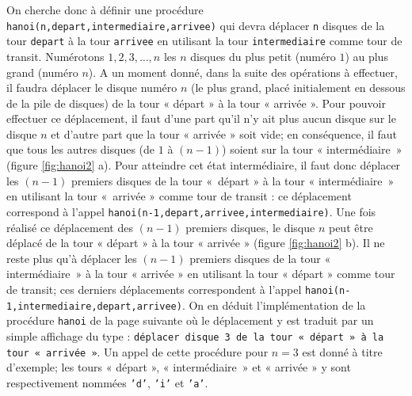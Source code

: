 \noindent On cherche donc à définir une procédure 
{\tt hanoi(n,depart,intermediaire,arrivee)} qui devra déplacer
{\tt n} disques de la tour {\tt depart} à la tour {\tt arrivee}
en utilisant la tour {\tt intermediaire} comme tour de 
transit.
Numérotons $1,2,3,\ldots,n$ les $n$ disques du plus
petit (numéro $1$) au plus grand (numéro $n$). A un moment donné,
dans la suite des opérations à effectuer, il faudra déplacer le disque 
numéro $n$ (le plus grand, placé initialement en dessous de la 
pile de disques) de la tour « départ » à la tour « arrivée ».
Pour pouvoir effectuer ce déplacement, il faut d'une part qu'il n'y ait plus
aucun disque sur le disque $n$ et d'autre part que la tour « arrivée » soit vide;
en conséquence, il faut que tous les autres disques (de $1$ à $(n-1)$) soient
sur la tour « intermédiaire~» (figure \ref{fig:hanoi2} a). Pour atteindre cet état
intermédiaire, il faut donc déplacer les $(n-1)$ premiers disques de la tour
«~départ » à la tour « intermédiaire~» en utilisant la tour «~arrivée » comme
tour de transit : ce déplacement correspond à l'appel 
{\tt hanoi(n-1,depart,arrivee,intermediaire)}. Une fois réalisé ce déplacement
des $(n-1)$ premiers disques, le disque $n$ peut être déplacé de la tour « départ » 
à la tour « arrivée » (figure \ref{fig:hanoi2} b).
Il ne reste plus qu'à déplacer les $(n-1)$ premiers disques de la tour 
« intermédiaire~» à la tour « arrivée » en utilisant la tour « départ » comme
tour de transit; ces derniers déplacements correspondent
à l'appel {\tt hanoi(n-1,intermediaire,depart,arrivee)}.
On en déduit l'implémentation de la procédure {\tt hanoi} de la page suivante
où le déplacement y est traduit par un simple affichage du type :
{\tt déplacer disque 3 de la tour « départ » à la tour « arrivée »}. Un appel
de cette procédure pour $n = 3$ est donné à titre d'exemple; 
les tours « départ », « intermédiaire~» et « arrivée »
y sont respectivement nommées {\tt 'd'}, {\tt 'i'} et {\tt 'a'}.


